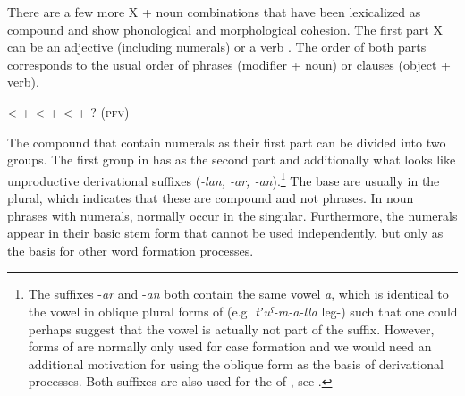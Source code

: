 There are a few more X + noun combinations that have been lexicalized as compound  and show phonological and morphological cohesion. The first part X can be an adjective (including numerals) or a verb . The order of both parts corresponds to the usual order of phrases (modifier + noun) or clauses (object + verb). 


%
\begin{exe}
	\ex	\label{ex:χːulabamother-in-law} 
	\begin{xlist}
		\TabPositions{10em,12em}
		\ex	{}			\tab	<	\tab	 {}  +  
		\ex	{}			\tab	<	\tab	 {}  +  
	\ex	{}  			\tab	<	\tab	{}  + ?   (\textsc{pfv})
			
	\end{xlist}
\end{exe}	

%

The compound  that contain numerals as their first part can be divided into two groups. The first group in  has  as the second part and additionally what looks like unproductive derivational suffixes (\textit{-lan, -ar, -an}).\footnote{The suffixes -\textit{ar} and -\textit{an} both contain the same vowel \textit{a}, which is identical to the vowel in oblique plural forms of  (e.g. \textit{tʼuˁ-m-a-lla} leg-) such that one could perhaps suggest that the vowel is actually not part of the suffix. However,  forms of  are normally only used for case formation and we would need an additional motivation for using the oblique form as the basis of derivational processes. Both suffixes are also used for the  of , see .} The base  are usually in the plural, which indicates that these are compound  and not phrases. In noun phrases with numerals,  normally occur in the singular. Furthermore, the numerals appear in their basic stem form that cannot be used independently, but only as the basis for other word formation processes. 

